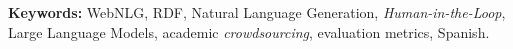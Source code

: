 \vspace{1em}
\noindent\textbf{Keywords:} WebNLG, RDF, Natural Language Generation,
\textit{Human-in-the-Loop}, Large Language Models, academic
\textit{crowdsourcing}, evaluation metrics, Spanish.

